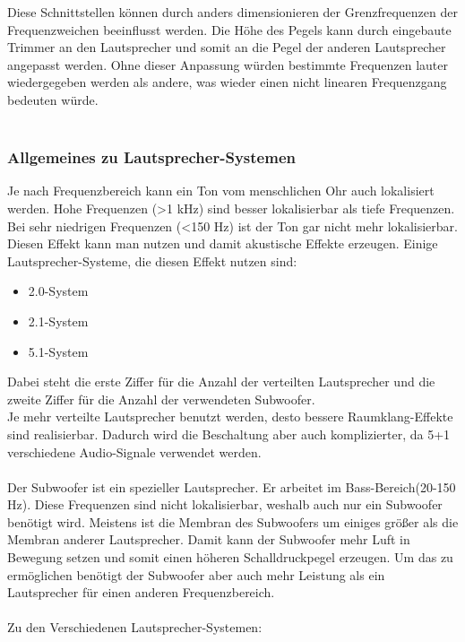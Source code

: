 Diese Schnittstellen können durch anders dimensionieren der Grenzfrequenzen der Frequenzweichen beeinflusst werden.
Die Höhe des Pegels kann durch eingebaute Trimmer an den Lautsprecher und somit an die Pegel der anderen Lautsprecher angepasst werden.
Ohne dieser Anpassung würden bestimmte Frequenzen lauter wiedergegeben werden als andere, was wieder einen nicht linearen Frequenzgang bedeuten würde.\\ \\


\subsubsection*{Allgemeines zu Lautsprecher-Systemen}
Je nach Frequenzbereich kann ein Ton vom menschlichen Ohr auch lokalisiert \mbox{werden}.
Hohe Frequenzen (>1 kHz) sind besser lokalisierbar als tiefe Frequenzen.
Bei sehr niedrigen Frequenzen (<150 Hz) ist der Ton gar nicht mehr lokalisierbar.
Diesen \mbox{Effekt} kann man nutzen und damit akustische Effekte erzeugen.
Einige Lautsprecher-Systeme, die diesen Effekt nutzen sind:
\begin{itemize}
	\item 2.0-System
	\item 2.1-System
	\item 5.1-System
\end{itemize}
Dabei steht die erste Ziffer für die Anzahl der verteilten Lautsprecher und die zweite Ziffer für die Anzahl der verwendeten Subwoofer.
\\
Je mehr verteilte Lautsprecher benutzt werden, desto bessere Raumklang-Effekte sind realisierbar.
Dadurch wird die Beschaltung aber auch komplizierter, da 5+1 verschiedene Audio-Signale verwendet werden.
\\ \\
Der Subwoofer ist ein spezieller Lautsprecher.
Er arbeitet im Bass-Bereich(20-150 Hz).
Diese Frequenzen sind nicht lokalisierbar, weshalb auch nur ein Subwoofer benötigt wird.
Meistens ist die Membran des Subwoofers um einiges größer als die Membran anderer Lautsprecher.
Damit kann der Subwoofer mehr Luft in Bewegung setzen und somit einen höheren Schalldruckpegel erzeugen.
Um das zu ermöglichen benötigt der Subwoofer aber auch mehr Leistung als ein Lautsprecher für einen anderen Frequenzbereich.
\\ \\

Zu den Verschiedenen Lautsprecher-Systemen:
